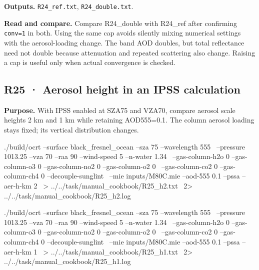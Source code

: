 \textbf{Outputs. }\texttt{R24\_\allowbreak{}ref.txt}, \texttt{R24\_\allowbreak{}double.txt}.

\textbf{Read and compare. }Compare R24\_double with R24\_ref after confirming \texttt{conv=\allowbreak{}1} in both. Using the same cap avoids silently mixing numerical settings with the aerosol-loading change. The band AOD doubles, but total reflectance need not double because attenuation and repeated scattering also change. Raising a cap is useful only when actual convergence is checked.


\subsection{R25 · Aerosol height in an IPSS calculation}
\label{sec:auto:09_cookbook:5.5}

\label{recipe:R25}

\textbf{Purpose. }With IPSS enabled at SZA75\textdegree{} and VZA70\textdegree{}, compare aerosol scale heights 2 km and 1 km while retaining AOD555=0.1. The column aerosol loading stays fixed; its vertical distribution changes.

\noindent\begin{minipage}{\linewidth}
\begin{ManualCode}

./build/ocrt --surface black_fresnel_ocean --sza 75 --wavelength 555 \
  --pressure 1013.25 --vza 70 --raa 90 --wind-speed 5 --n-water 1.34 \
  --gas-column-h2o 0 --gas-column-o3 0 --gas-column-no2 0 --gas-column-o2 0 \
  --gas-column-co2 0 --gas-column-ch4 0 --decouple-sunglint \
  --mie inputs/M80C.mie --aod-555 0.1 --pssa --aer-h-km 2 \
  > ../../task/manual_cookbook/R25_h2.txt \
  2> ../../task/manual_cookbook/R25_h2.log

\end{ManualCode}
\end{minipage}\par

\noindent\begin{minipage}{\linewidth}
\begin{ManualCode}

./build/ocrt --surface black_fresnel_ocean --sza 75 --wavelength 555 \
  --pressure 1013.25 --vza 70 --raa 90 --wind-speed 5 --n-water 1.34 \
  --gas-column-h2o 0 --gas-column-o3 0 --gas-column-no2 0 --gas-column-o2 0 \
  --gas-column-co2 0 --gas-column-ch4 0 --decouple-sunglint \
  --mie inputs/M80C.mie --aod-555 0.1 --pssa --aer-h-km 1 \
  > ../../task/manual_cookbook/R25_h1.txt \
  2> ../../task/manual_cookbook/R25_h1.log

\end{ManualCode}
\end{minipage}\par

